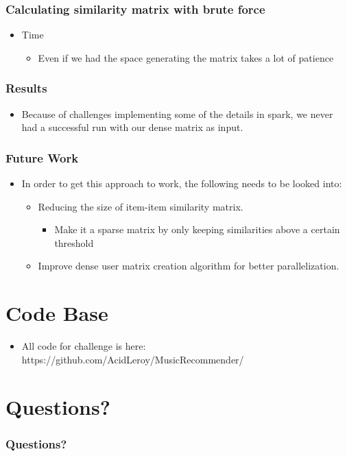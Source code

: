 \documentclass[11pt]{beamer}
\begin{document}
  \begin{frame}
    \frametitle{Calculating similarity matrix with brute force}
    \begin{itemize}
      \item Time 
        \begin{itemize}
          \item Even if we had the space generating the matrix takes a lot of patience 
        \end{itemize}
    \end{itemize}
  \end{frame}

  \begin{frame}
    \frametitle{Results}
    \begin{itemize}
      \item Because of challenges implementing some of the details in spark, we never had a successful run
      with our dense matrix as input.
    \end{itemize}
  \end{frame}

  \begin{frame}
    \frametitle{Future Work}
    \begin{itemize}
      \item In order to get this approach to work, the following needs to be looked into: 
      \begin{itemize}
        \item Reducing the size of item-item similarity matrix.
        \begin{itemize}
          \item Make it a sparse matrix by only keeping similarities above a certain threshold
        \end{itemize}
        \item Improve dense user matrix creation algorithm for better parallelization. 
      \end{itemize}
    \end{itemize}
  \end{frame}

  \section{Code Base}
  \begin{frame}
    \begin{itemize}
      \item All code for challenge is here: https://github.com/AcidLeroy/MusicRecommender/
    \end{itemize}
  \end{frame}

  \section{Questions?}
  \begin{frame}
    \frametitle{Questions?}
  \end{frame}

  
\end{document}
